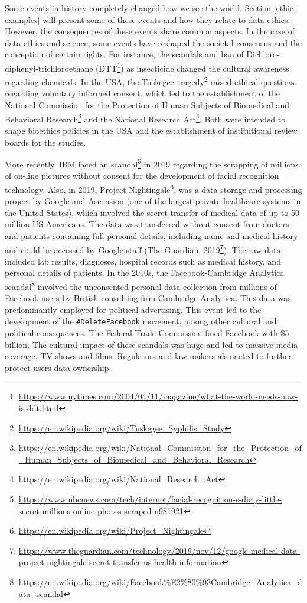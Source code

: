 \documentclass[
  12pt,
]{book}
\DeclareRobustCommand{\href}[2]{#2\footnote{\url{#1}}}
\begin{document}
Some events in history completely changed how we see the world. Section \ref{ethic-examples} will present some of these events and how they relate to data ethics. However, the consequences of these events share common aspects. In the case of data ethics and science, some events have reshaped the societal consensus and the conception of certain rights. For instance, the scandals and ban of Dichloro-diphenyl-trichloroethane (\href{https://www.nytimes.com/2004/04/11/magazine/what-the-world-needs-now-is-ddt.html}{DTT}) as insecticide changed the cultural awareness regarding chemicals. In the USA, the \href{https://en.wikipedia.org/wiki/Tuskegee_Syphilis_Study}{Tuskegee tragedy} raised ethical questions regarding voluntary informed consent, which led to the establishment of the \href{https://en.wikipedia.org/wiki/National_Commission_for_the_Protection_of_Human_Subjects_of_Biomedical_and_Behavioral_Research}{National Commission for the Protection of Human Subjects of Biomedical and Behavioral Research} and the \href{https://en.wikipedia.org/wiki/National_Research_Act}{National Research Act}. Both were intended to shape bioethics policies in the USA and the establishment of institutional review boards for the studies.

More recently, \href{https://www.nbcnews.com/tech/internet/facial-recognition-s-dirty-little-secret-millions-online-photos-scraped-n981921}{IBM faced an scandal} in 2019 regarding the scrapping of millions of on-line pictures without consent for the development of facial recognition technology. Also, in 2019, \href{https://en.wikipedia.org/wiki/Project_Nightingale}{Project Nightingale}, was a data storage and processing project by Google and Ascension (one of the largest private healthcare systems in the United States), which involved the secret transfer of medical data of up to 50 million US Americans. The data was transferred without consent from doctors and patients containing full personal details, including name and medical history and could be accessed by Google staff (\href{https://www.theguardian.com/technology/2019/nov/12/google-medical-data-project-nightingale-secret-transfer-us-health-information}{The Guardian, 2019}). The raw data included lab results, diagnoses, hospital records such as medical history, and personal details of patients. In the 2010s, the \href{https://en.wikipedia.org/wiki/Facebook\%E2\%80\%93Cambridge_Analytica_data_scandal}{Facebook-Cambridge Analytica scandal} involved the unconsented personal data collection from millions of Facebook users by British consulting firm Cambridge Analytica. This data was predominantly employed for political advertising. This event led to the development of the \texttt{\#DeleteFacebook} movement, among other cultural and political consequences. The Federal Trade Commission fined Facebook with \$5 billion. The cultural impact of these scandals was huge and led to massive media coverage, TV shows and films. Regulators and law makers also acted to further protect users data ownership.
\end{document}
